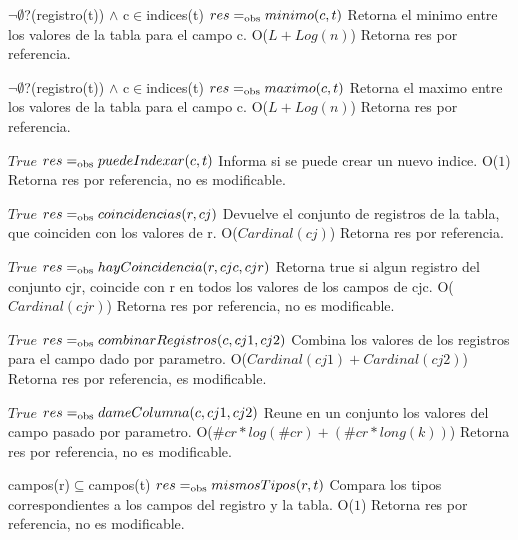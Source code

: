  {$\neg\emptyset$?(registro(t)) $\land$ c$\in$indices(t)}
 {$res =_{\mathrm{obs}} minimo(c,t)$}
 {Retorna el minimo entre los valores de la tabla para el campo c.}
 {O($L+Log(n)$)}
 {Retorna res por referencia.}
  
 {$\neg\emptyset$?(registro(t)) $\land$ c$\in$indices(t)}
 {$res =_{\mathrm{obs}} maximo(c,t)$}
 {Retorna el maximo entre los valores de la tabla para el campo c.}
 {O($L+Log(n)$)}
 {Retorna res por referencia.} 

 {$True$}
 {$res =_{\mathrm{obs}} puedeIndexar(c,t)$}
 {Informa si se puede crear un nuevo indice.}
 {O($1$)}
 {Retorna res por referencia, no es modificable.}

 {$True$}
 {$res =_{\mathrm{obs}} coincidencias(r,cj)$}
 {Devuelve el conjunto de registros de la tabla, que coinciden con los valores de r.}
 {O($Cardinal(cj)$)}
 {Retorna res por referencia.} 
 

 {$True$}
 {$res =_{\mathrm{obs}} hayCoincidencia(r,cjc,cjr)$}
 {Retorna true si algun registro del conjunto cjr, coincide con r en todos los valores de los campos de cjc.}
 {O($Cardinal(cjr)$)}
 {Retorna res por referencia, no es modificable.} 


 {$True$}
 {$res =_{\mathrm{obs}} combinarRegistros(c,cj1,cj2)$}
 {Combina los valores de los registros para el campo dado por parametro.}
 {O($Cardinal(cj1)+Cardinal(cj2)$)}
 {Retorna res por referencia, es modificable.}

 {$True$}
 {$res =_{\mathrm{obs}} dameColumna(c,cj1,cj2)$}
 {Reune en un conjunto los valores del campo pasado por parametro.}
 {O($\#cr *log(\#cr) + (\#cr *long(k)) $)}
 {Retorna res por referencia, no es modificable.} 

 {campos(r)$\subseteq$campos(t)}
 {$res =_{\mathrm{obs}} mismosTipos(r,t)$}
 {Compara los tipos correspondientes a los campos del registro y la tabla.}
 {O($1$)}
 {Retorna res por referencia, no es modificable.} 

